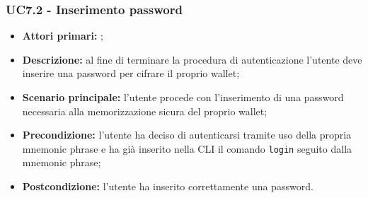 \subsubsection{UC7.2 - Inserimento password}
\begin{itemize}
	\item \textbf{Attori primari:} \una{};
	\item \textbf{Descrizione:} al fine di terminare la procedura di autenticazione l’utente deve inserire una password per cifrare il proprio wallet;
	\item \textbf{Scenario principale:} l’utente procede con l’inserimento di 
	una password necessaria alla memorizzazione sicura del proprio wallet;  
	\item \textbf{Precondizione:} l’utente ha deciso di autenticarsi tramite uso della propria mnemonic phrase e ha già inserito nella CLI il comando \texttt{login} seguito dalla mnemonic phrase; 
	\item \textbf{Postcondizione:} l’utente ha inserito correttamente una password. 
\end{itemize}
